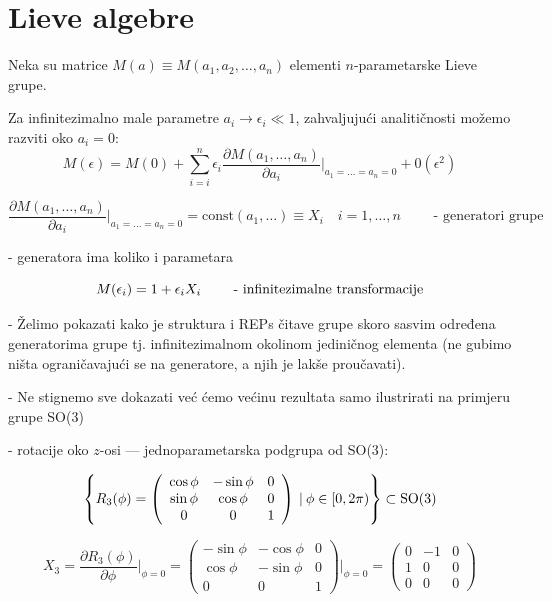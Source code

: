 \section{Lieve algebre}
\label{sec:lievealgebre}

Neka su matrice $M(a)\equiv M(a_1, a_2, \ldots, a_n)$ elementi $n$-parametarske
Lieve grupe.
 
Za infinitezimalno male parametre $a_i \to \epsilon_i \ll 1$, zahvaljujući
analitičnosti možemo razviti oko $a_i = 0$:
\begin{displaymath}
   M(\epsilon)=M(0)+ \sum_{i=i}^{n}\epsilon_i \frac{\partial M(a_1, \ldots, a_n)}
 {\partial a_i}\Bigg|_{a_1=\ldots =a_n=0} + 0(\epsilon^2)
\end{displaymath}


\begin{displaymath}
 \frac{\partial M(a_1, \ldots, a_n)}
 {\partial a_i}\Bigg|_{a_1=\ldots =a_n=0} = \textrm{const}(a_1, \ldots)
 \equiv  X_i  \quad i=1, \ldots, n \qquad \textrm{ - generatori grupe}
\end{displaymath}

- generatora ima koliko i parametara

\begin{displaymath}
  M(\epsilon_i)=1 + \epsilon_i X_i \qquad \textrm{ -
  infinitezimalne transformacije}
\end{displaymath}

- Želimo pokazati kako je struktura i REPs čitave grupe skoro sasvim
određena generatorima grupe tj. infinitezimalnom okolinom jediničnog 
elementa (ne gubimo ništa ograničavajući se na generatore, a njih
je lakše proučavati).

- Ne stignemo sve dokazati već ćemo većinu rezultata samo ilustrirati
  na primjeru grupe SO(3)


- rotacije oko $z$-osi --- jednoparametarska podgrupa od SO(3):

\begin{displaymath}
\left\{ R_3 (\phi) = \left( 
\begin{array}{ccc}
\cos\phi & -\sin\phi & 0 \\
\sin\phi & \cos\phi & 0 \\
0 & 0 & 1 
\end{array}
\right) \: | \: \phi \in [0, 2\pi) \right\} \subset \textrm{SO(3)}
\end{displaymath}

\begin{displaymath}
X_3 = \frac{\partial R_3 (\phi)}{\partial \phi}\Bigg|_{\phi=0}=
\left( \begin{array}{ccc}
-\sin\phi & -\cos\phi & 0 \\
\cos\phi & -\sin\phi & 0 \\
0 & 0 & 1 
\end{array} \right)\Bigg|_{\phi=0} =
\left( \begin{array}{ccc}
0 & -1 & 0 \\
1 & 0 & 0 \\
0 & 0 & 0 
\end{array} \right)
\end{displaymath}

